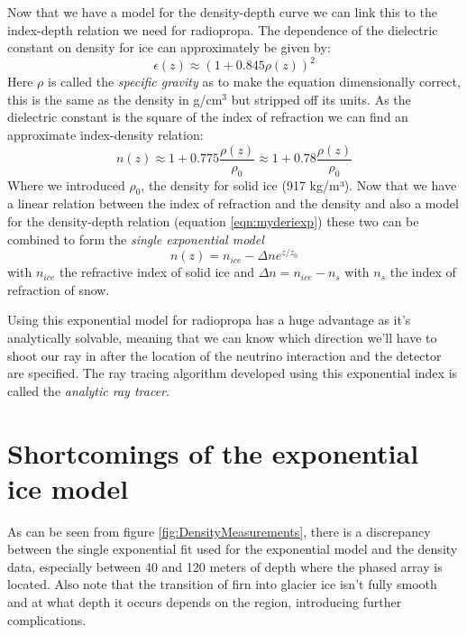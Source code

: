 Now that we have a model for the density-depth curve we can link this to the
index-depth relation we need for radiopropa.  The dependence of the dielectric
constant on density for ice can approximately be given by\cite{Robin}:
\begin{equation} 
	\epsilon(z) \approx (1 + 0.845\rho(z))^2 
\end{equation} 
Here $\rho$ is called the \textit{specific gravity} as to make the equation
dimensionally correct, this is the same as the density in g/cm$^3$ but stripped
off its units.  As the dielectric constant is the square of the index of
refraction we can find an approximate index-density relation:
\begin{equation} 
	n(z) \approx 1 + 0.775\frac{\rho(z)}{\rho_0} \approx 1 + 0.78\frac{\rho(z)}{\rho_0} \label{eqn:Schytt}
\end{equation} 
Where we introduced $\rho_0$, the density for solid ice (917 kg/m³).  
Now that we have a linear relation between the index of refraction and the density
and also a model for the density-depth relation (equation \ref{eqn:myderiexp}) these two can
be combined to form the \textit{single exponential model}
\begin{equation}
	\label{eqn:expn}
	n(z) = n_{ice} - \Delta n e^{z/z_0}
\end{equation}
with $n_{ice}$ the refractive index of solid ice and $\Delta n = n_{ice} - n_s$
with $n_s$ the index of refraction of snow. 

Using this exponential model for radiopropa has a huge advantage as it's
analytically solvable, meaning that we can know which direction we'll have to
shoot our ray in after the location of the neutrino interaction and the
detector are specified. The ray tracing algorithm developed using this
exponential index is called the \textit{analytic ray tracer}.

\section{Shortcomings of the exponential ice model}
As can be seen from figure \ref{fig:DensityMeasurements}, there is a
discrepancy between the single exponential fit used for the exponential model
and the density data, especially between 40 and 120 meters of depth where the
phased array is located.  
Also note that the transition of firn into glacier ice \cite{10.2307/97323} isn't fully smooth and at what depth it occurs depends on the region, introducing
further complications.


